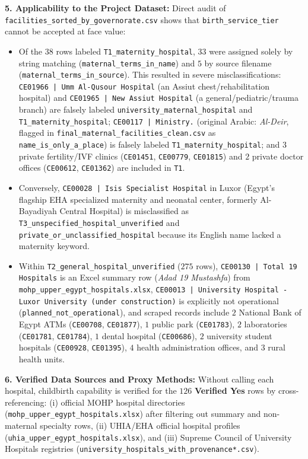 \documentclass[10pt,a4paper]{article}
\begin{document}
\textbf{5. Applicability to the Project Dataset:}
Direct audit of \texttt{facilities\_sorted\_by\_governorate.csv} shows that \texttt{birth\_service\_tier} cannot be accepted at face value:
\begin{itemize}
    \item Of the $38$ rows labeled \texttt{T1\_maternity\_hospital}, $33$ were assigned solely by string matching (\texttt{maternal\_terms\_in\_name}) and $5$ by source filename (\texttt{maternal\_terms\_in\_source}). This resulted in severe misclassifications: \texttt{CE01966 | Umm Al-Qusour Hospital} (an Assiut chest/rehabilitation hospital) and \texttt{CE01965 | New Assiut Hospital} (a general/pediatric/trauma branch) are falsely labeled \texttt{university\_maternal\_hospital} and \texttt{T1\_maternity\_hospital}; \texttt{CE00117 | Ministry.} (original Arabic: \textit{Al-Deir}, flagged in \texttt{final\_maternal\_facilities\_clean.csv} as \texttt{name\_is\_only\_a\_place}) is falsely labeled \texttt{T1\_maternity\_hospital}; and $3$ private fertility/IVF clinics (\texttt{CE01451}, \texttt{CE00779}, \texttt{CE01815}) and $2$ private doctor offices (\texttt{CE00612}, \texttt{CE01362}) are included in \texttt{T1}.
    \item Conversely, \texttt{CE00028 | Isis Specialist Hospital} in Luxor (Egypt's flagship EHA specialized maternity and neonatal center, formerly Al-Bayadiyah Central Hospital) is misclassified as \texttt{T3\_unspecified\_hospital\_unverified} and \texttt{private\_or\_unclassified\_hospital} because its English name lacked a maternity keyword.
    \item Within \texttt{T2\_general\_hospital\_unverified} ($275$ rows), \texttt{CE00130 | Total 19 Hospitals} is an Excel summary row (\textit{Adad 19 Mustashfa}) from \texttt{mohp\_upper\_egypt\_hospitals.xlsx}, \texttt{CE00013 | University Hospital - Luxor University (under construction)} is explicitly not operational (\texttt{planned\_not\_operational}), and scraped records include $2$ National Bank of Egypt ATMs (\texttt{CE00708}, \texttt{CE01877}), $1$ public park (\texttt{CE01783}), $2$ laboratories (\texttt{CE01781}, \texttt{CE01784}), $1$ dental hospital (\texttt{CE00686}), $2$ university student hospitals (\texttt{CE00928}, \texttt{CE01395}), $4$ health administration offices, and $3$ rural health units.
\end{itemize}

\textbf{6. Verified Data Sources and Proxy Methods:}
Without calling each hospital, childbirth capability is verified for the $126$ \textbf{Verified Yes} rows by cross-referencing: (i) official MOHP hospital directories (\texttt{mohp\_upper\_egypt\_hospitals.xlsx}) after filtering out summary and non-maternal specialty rows, (ii) UHIA/EHA official hospital profiles (\texttt{uhia\_upper\_egypt\_hospitals.xlsx}), and (iii) Supreme Council of University Hospitals registries (\texttt{university\_hospitals\_with\_provenance*.csv}).
\end{document}
